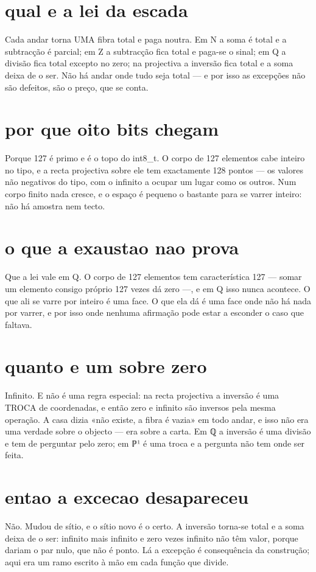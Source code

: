 \documentclass[11pt,a4paper]{article}
\begin{document}
\section{qual e a lei da escada}
Cada andar torna UMA fibra total e paga noutra. Em N a soma é total e a subtracção é
parcial; em Z a subtracção fica total e paga-se o sinal; em Q a divisão fica total excepto
no zero; na projectiva a inversão fica total e a soma deixa de o ser. Não há andar onde
tudo seja total — e por isso as excepções não são defeitos, são o preço, que se conta.

\section{por que oito bits chegam}
Porque 127 é primo e é o topo do int8_t. O corpo de 127 elementos cabe inteiro no tipo, e
a recta projectiva sobre ele tem exactamente 128 pontos — os valores não negativos do
tipo, com o infinito a ocupar um lugar como os outros. Num corpo finito nada cresce, e o
espaço é pequeno o bastante para se varrer inteiro: não há amostra nem tecto.

\section{o que a exaustao nao prova}
Que a lei vale em Q. O corpo de 127 elementos tem característica 127 — somar um elemento
consigo próprio 127 vezes dá zero —, e em Q isso nunca acontece. O que ali se varre por
inteiro é uma face. O que ela dá é uma face onde não há nada por varrer, e por isso onde
nenhuma afirmação pode estar a esconder o caso que faltava.

\section{quanto e um sobre zero}
Infinito. E não é uma regra especial: na recta projectiva a inversão é uma TROCA de
coordenadas, e então zero e infinito são inversos pela mesma operação. A casa dizia «não
existe, a fibra é vazia» em todo andar, e isso não era uma verdade sobre o objecto — era
sobre a carta. Em ℚ a inversão é uma divisão e tem de perguntar pelo zero; em ℙ¹ é uma
troca e a pergunta não tem onde ser feita.

\section{entao a excecao desapareceu}
Não. Mudou de sítio, e o sítio novo é o certo. A inversão torna-se total e a soma deixa
de o ser: infinito mais infinito e zero vezes infinito não têm valor, porque dariam o par
nulo, que não é ponto. Lá a excepção é consequência da construção; aqui era um ramo
escrito à mão em cada função que divide.
\end{document}
